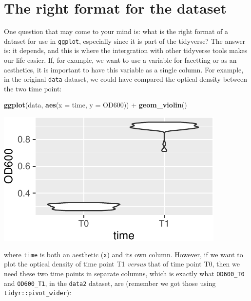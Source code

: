 \documentclass[]{book}
\newenvironment{Shaded}{}{}
\newcommand{\DataTypeTok}[1]{\textcolor[rgb]{0.56,0.13,0.00}{#1}}
\newcommand{\KeywordTok}[1]{\textcolor[rgb]{0.00,0.44,0.13}{\textbf{#1}}}
\newcommand{\NormalTok}[1]{#1}
\newcommand{\OperatorTok}[1]{\textcolor[rgb]{0.40,0.40,0.40}{#1}}
\newcommand{\StringTok}[1]{\textcolor[rgb]{0.25,0.44,0.63}{#1}}
\begin{document}
\hypertarget{the-right-format-for-the-dataset}{%
\section{The right format for the dataset}\label{the-right-format-for-the-dataset}}

One question that may come to your mind is: what is the right format of a dataset for use in \texttt{ggplot}, especially since it is part of the tidyverse? The answer is: it depends, and this is where the intergration with other tidyverse tools makes our life easier. If, for example, we want to use a variable for facetting or as an aesthetics, it is important to have this variable as a single column. For example, in the original \texttt{data} dataset, we could have compared the optical density between the two time point:

\begin{Shaded}
\begin{Highlighting}[]
\KeywordTok{ggplot}\NormalTok{(data, }\KeywordTok{aes}\NormalTok{(}\DataTypeTok{x =}\NormalTok{ time, }\DataTypeTok{y =}\NormalTok{ OD600)) }\OperatorTok{+}
\StringTok{  }\KeywordTok{geom_violin}\NormalTok{()}
\end{Highlighting}
\end{Shaded}

\begin{center}\includegraphics[width=\textwidth]{TRES-Tidy-Tutorial_files/figure-latex/unnamed-chunk-136-1} \end{center}

where \texttt{time} is both an aesthetic (\texttt{x}) and its own column. However, if we want to plot the optical density of time point T1 \emph{versus} that of time point T0, then we need these two time points in separate columns, which is exactly what \texttt{OD600\_T0} and \texttt{OD600\_T1}, in the \texttt{data2} dataset, are (remember we got those using \texttt{tidyr::pivot\_wider}):
\end{document}
